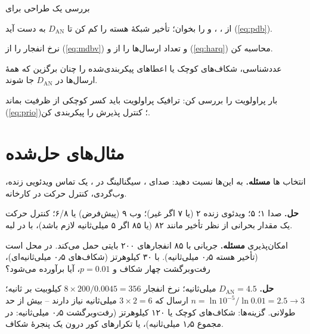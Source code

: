 \documentclass[11pt,a4paper]{article}
\begin{document}
\begin{procedurebox}{بررسی یک طراحی  برای }\label{proc:urllc}
\begin{steps}
  \item از ، ،  و  را بخوان؛ تأخیر شبکهٔ هسته را کم کن تا $D_{\mathrm{AN}}$ به دست آید (\cref{eq:pdb}).
  \item نرخ انفجار را از  (\cref{eq:mdbv}) و تعداد ارسال‌ها را از  و  (\cref{eq:harq}) محاسبه کن.
  \item عددشناسی، شکاف‌های کوچک یا اعطاهای پیکربندی‌شده را چنان برگزین که همهٔ ارسال‌ها در $D_{\mathrm{AN}}$ جا شوند.
  \item بار پراولویت را بررسی کن: ترافیک پراولویت باید کسر کوچکی از ظرفیت بماند (\cref{eq:prio})؛ کنترل پذیرش را پیکربندی کن.
\end{steps}
\end{procedurebox}

\section{مثال‌های حل‌شده}

\begin{examplebox}{انتخاب ها}\label{ex:5qi}
\textbf{مسئله.} به این‌ها  نسبت دهید: صدای ، سیگنالینگ  در ، یک تماس ویدئویی زنده، وب‌گردی، کنترل حرکت در
کارخانه.

\textbf{حل.} صدا ۱؛  ۵؛ ویدئوی زنده ۲ (یا ۷ اگر غیر)؛ وب ۹ (پیش‌فرض) یا ۶/۸؛ کنترل حرکت یک مقدار  بحرانی از نظر
تأخیر مانند ۸۲ (یا ۸۵ اگر ۵ میلی‌ثانیه لازم باشد)، با  در لبه.
\end{examplebox}

\begin{examplebox}{امکان‌پذیری }\label{ex:urllc}
\textbf{مسئله.} جریانی با  ۸۵ انفجارهای ۲۰۰ بایتی حمل می‌کند.  در محل است (تأخیر هسته ۰٫۵ میلی‌ثانیه). با  ۳۰
کیلوهرتز (شکاف‌های ۰٫۵ میلی‌ثانیه‌ای)، رفت‌وبرگشت  چهار شکاف و $p = 0.01$، آیا  برآورده می‌شود؟

\textbf{حل.} $D_{\mathrm{AN}} = 4.5$ میلی‌ثانیه؛ نرخ انفجار $8\times200/0.0045 = 356$ کیلوبیت بر ثانیه؛ $n = \ln10^{-5}/\ln0.01 = 2.5 \to 3$ ارسال که
$3\times2 = 6$ میلی‌ثانیه نیاز دارند -- بیش از حد طولانی. گزینه‌ها: شکاف‌های کوچک یا  ۱۲۰ کیلوهرتز (رفت‌وبرگشت  ۰٫۵
میلی‌ثانیه: در مجموع ۱٫۵ میلی‌ثانیه)، یا تکرارهای کور درون یک پنجرهٔ شکاف.
\end{examplebox}
\end{document}
